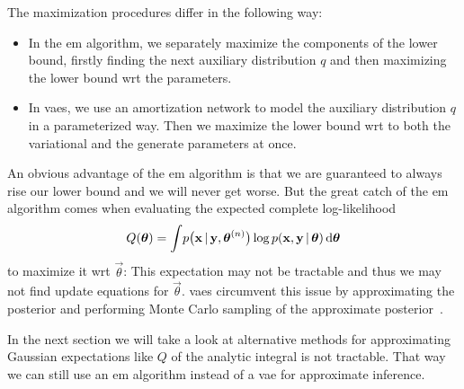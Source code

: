 			The maximization procedures differ in the following way:
			\begin{itemize}
				\item In the \ac{em} algorithm, we separately maximize the components of the lower bound, firstly finding the next auxiliary distribution \(q\) and then maximizing the lower bound \ac{wrt} the parameters.
				\item In \acp{vae}, we use an amortization network to model the auxiliary distribution \(q\) in a parameterized way. Then we maximize the lower bound \ac{wrt} to both the variational and the generate parameters at once.
			\end{itemize}
			An obvious advantage of the \ac{em} algorithm is that we are guaranteed to always rise our lower bound and we will never get worse. But the great catch of the \ac{em} algorithm comes when evaluating the expected complete log-likelihood
			\begin{align*}
				Q(\boldsymbol{\mathrm{\theta}}) = \int\! p\big(\boldsymbol{\mathrm{x}} \,\vert\, \boldsymbol{\mathrm{y}}, \boldsymbol{\mathrm{\theta}}^{(n)}\big) \log p(\boldsymbol{\mathrm{x}}, \boldsymbol{\mathrm{y}} \,\vert\, \boldsymbol{\mathrm{\theta}}) \dd{\boldsymbol{\mathrm{\theta}}}
			\end{align*}
			to maximize it \ac{wrt} \(\vec{\theta}\): This expectation may not be tractable and thus we may not find update equations for \(\vec{\theta}\). \acp{vae} circumvent this issue by approximating the posterior and performing Monte Carlo sampling of the approximate posterior~\cite{kingmaAutoEncodingVariationalBayes2014}.


			In the next section we will take a look at alternative methods for approximating Gaussian expectations like \(Q\) of the analytic integral is not tractable. That way we can still use an \ac{em} algorithm instead of a \ac{vae} for approximate inference.
